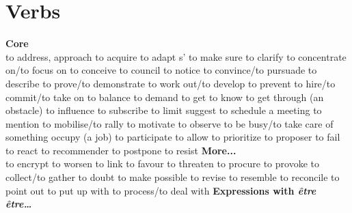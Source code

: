 \section{Verbs}
{\sffamily\bfseries Core}\\
   {to address, approach}
   {to acquire}
   {to adapt}
 {s'}   {to make sure}
   {to clarify}
   {to concentrate on/to focus on}
   {to conceive}
   {to council}
   {to notice}
   {to convince/to pursuade}
   {to describe}
   {to prove/to demonstrate}
   {to work out/to develop}
   {to prevent}
   {to hire/to commit/to take on}
   {to balance}
   {to demand}
   {to get to know}
   {to get through (an obstacle)}
   {to influence}
   {to subscribe}
   {to limit}
   {suggest}
   {to schedule a meeting}
   {to mention}
   {to mobilise/to rally}
   {to motivate}
   {to observe}
   {to be busy/to take care of something}
   {occupy (a job)}
   {to participate}
   {to allow}
   {to prioritize}
   {to proposer}
   {to fail}
   {to react}
   {to recommender}
   {to postpone}
   {to resist}\newline
{\sffamily\bfseries More...}\\
   {to encrypt}
   {to worsen}
   {to link}
   {to favour}
   {to threaten}
   {to procure}
   {to provoke}
   {to collect/to gather}
   {to doubt}
   {to make possible}
   {to revise}
   {to resemble}
   {to reconcile}
   {to point out}
   {to put up with}
   {to process/to deal with}
     {\sffamily\bfseries Expressions with {\em être}}\\
     {\bf {\em être\ldots}}\\
